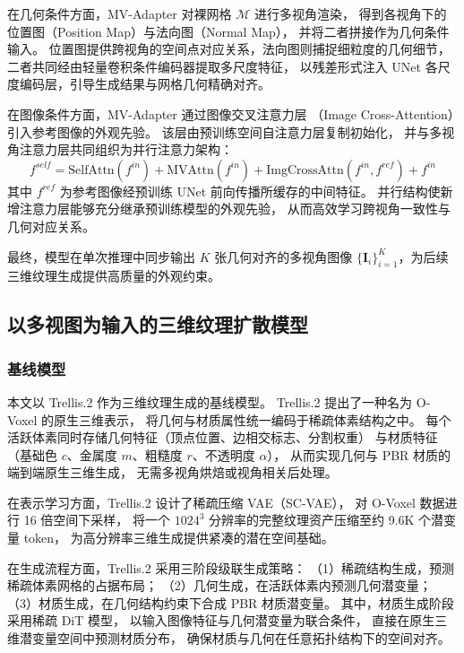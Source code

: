 在几何条件方面，MV-Adapter 对裸网格 $\mathcal{M}$ 进行多视角渲染，
得到各视角下的位置图（Position Map）与法向图（Normal Map），
并将二者拼接作为几何条件输入。
位置图提供跨视角的空间点对应关系，法向图则捕捉细粒度的几何细节，
二者共同经由轻量卷积条件编码器提取多尺度特征，
以残差形式注入 UNet 各尺度编码层，引导生成结果与网格几何精确对齐。

在图像条件方面，MV-Adapter 通过图像交叉注意力层
（Image Cross-Attention）引入参考图像的外观先验。
该层由预训练空间自注意力层复制初始化，
并与多视角注意力层共同组织为并行注意力架构：
\begin{equation}
    f^{self} = \text{SelfAttn}(f^{in}) + \text{MVAttn}(f^{in}) 
    + \text{ImgCrossAttn}(f^{in}, f^{ref}) + f^{in}
\end{equation}
其中 $f^{ref}$ 为参考图像经预训练 UNet 前向传播所缓存的中间特征。
并行结构使新增注意力层能够充分继承预训练模型的外观先验，
从而高效学习跨视角一致性与几何对应关系。

最终，模型在单次推理中同步输出 $K$ 张几何对齐的多视角图像
$\{\mathbf{I}_i\}_{i=1}^{K}$，为后续三维纹理生成提供高质量的外观约束。

\subsection{以多视图为输入的三维纹理扩散模型}
\label{sec:finetune}

\subsubsection{基线模型}

本文以 Trellis.2\cite{xiang2025native} 作为三维纹理生成的基线模型。
Trellis.2 提出了一种名为 O-Voxel 的原生三维表示，
将几何与材质属性统一编码于稀疏体素结构之中。
每个活跃体素同时存储几何特征（顶点位置、边相交标志、分割权重）
与材质特征（基础色 $c$、金属度 $m$、粗糙度 $r$、不透明度 $\alpha$），
从而实现几何与 PBR 材质的端到端原生三维生成，
无需多视角烘焙或视角相关后处理。

在表示学习方面，Trellis.2 设计了稀疏压缩 VAE（SC-VAE），
对 O-Voxel 数据进行 16 倍空间下采样，
将一个 $1024^3$ 分辨率的完整纹理资产压缩至约 9.6K 个潜变量 token，
为高分辨率三维生成提供紧凑的潜在空间基础。

在生成流程方面，Trellis.2 采用三阶段级联生成策略：
（1）稀疏结构生成，预测稀疏体素网格的占据布局；
（2）几何生成，在活跃体素内预测几何潜变量；
（3）材质生成，在几何结构约束下合成 PBR 材质潜变量。
其中，材质生成阶段采用稀疏 DiT 模型，
以输入图像特征与几何潜变量为联合条件，
直接在原生三维潜变量空间中预测材质分布，
确保材质与几何在任意拓扑结构下的空间对齐。

